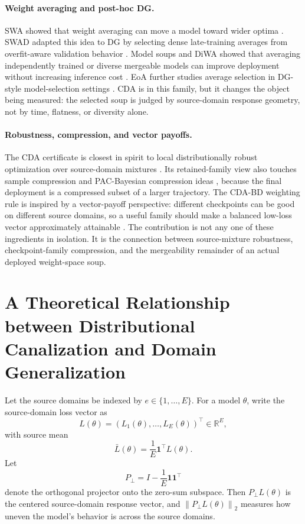 \documentclass{article}
\theoremstyle{definition}
\newcommand{\RR}{\mathbb{R}}
\newcommand{\one}{\mathbf{1}}
\newcommand{\bd}{\textup{\textsc{CDA-BD}}}
\newcommand{\norm}[1]{\left\lVert #1 \right\rVert}
\newcommand{\paren}[1]{\left( #1 \right)}
\begin{document}
\paragraph{Weight averaging and post-hoc DG.}
SWA showed that weight averaging can move a model toward wider optima \citep{izmailov2018swa}. SWAD adapted this idea to DG by selecting dense late-training averages from overfit-aware validation behavior \citep{cha2021swad}. Model soups and DiWA showed that averaging independently trained or diverse mergeable models can improve deployment without increasing inference cost \citep{wortsman2022soups,rame2022diwa}. EoA further studies average selection in DG-style model-selection settings \citep{arpit2022eoa}. CDA is in this family, but it changes the object being measured: the selected soup is judged by source-domain response geometry, not by time, flatness, or diversity alone.

\paragraph{Robustness, compression, and vector payoffs.}
The CDA certificate is closest in spirit to local distributionally robust optimization over source-domain mixtures \citep{duchi2020variance,duchi2021dro}. Its retained-family view also touches sample compression and PAC-Bayesian compression ideas \citep{floyd1989sample,graepel2005pacbayes}, because the final deployment is a compressed subset of a larger trajectory. The \bd{} weighting rule is inspired by a vector-payoff perspective: different checkpoints can be good on different source domains, so a useful family should make a balanced low-loss vector approximately attainable \citep{blackwell1956analog}. The contribution is not any one of these ingredients in isolation. It is the connection between source-mixture robustness, checkpoint-family compression, and the mergeability remainder of an actual deployed weight-space soup.

\section{A Theoretical Relationship between Distributional Canalization and Domain Generalization}
\label{sec:theory}

Let the source domains be indexed by \(e\in\{1,\dots,E\}\). For a model \(\theta\), write the source-domain loss vector as
\[
L(\theta)=\paren{L_1(\theta),\dots,L_E(\theta)}^\top \in \RR^E,
\]
with source mean
\[
\bar L(\theta)=\frac{1}{E}\one^\top L(\theta).
\]
Let
\[
P_\perp = I - \frac{1}{E}\one\one^\top
\]
denote the orthogonal projector onto the zero-sum subspace. Then \(P_\perp L(\theta)\) is the centered source-domain response vector, and \(\norm{P_\perp L(\theta)}_2\) measures how uneven the model's behavior is across the source domains.
\end{document}
